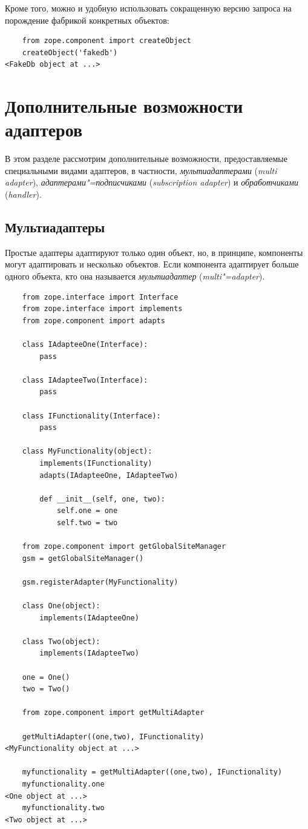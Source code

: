 \documentclass[a4paper,openany,twoside,draft]{book}
\providecommand*{\DUroletitlereference}[1]{\textsl{#1}}
\begin{document}
Кроме того, можно и удобную использовать сокращенную версию запроса на порождение фабрикой конкретных объектов:

\begin{verbatim}
    from zope.component import createObject
    createObject('fakedb')
<FakeDb object at ...>
\end{verbatim}


\chapter{Дополнительные возможности адаптеров%
  \label{id44}%
}

В этом разделе рассмотрим дополнительные возможности, предоставляемые специальными видами адаптеров, в частности, \DUroletitlereference{мультиадаптерами} (\DUroletitlereference{multi adapter}), \DUroletitlereference{адаптерами"=подписчиками} (\DUroletitlereference{subscription adapter}) и \DUroletitlereference{обработчиками} (\DUroletitlereference{handler}).


\section{Мультиадаптеры%
  \label{id45}%
}

Простые адаптеры адаптируют только один объект, но, в принципе, компоненты могут адаптировать и несколько объектов.  Если компонента адаптирует больше одного объекта, кто она называется \DUroletitlereference{мультиадаптер} (\DUroletitlereference{multi"=adapter}).

\begin{verbatim}
    from zope.interface import Interface
    from zope.interface import implements
    from zope.component import adapts

    class IAdapteeOne(Interface):
        pass

    class IAdapteeTwo(Interface):
        pass

    class IFunctionality(Interface):
        pass

    class MyFunctionality(object):
        implements(IFunctionality)
        adapts(IAdapteeOne, IAdapteeTwo)

        def __init__(self, one, two):
            self.one = one
            self.two = two

    from zope.component import getGlobalSiteManager
    gsm = getGlobalSiteManager()

    gsm.registerAdapter(MyFunctionality)

    class One(object):
        implements(IAdapteeOne)

    class Two(object):
        implements(IAdapteeTwo)

    one = One()
    two = Two()

    from zope.component import getMultiAdapter

    getMultiAdapter((one,two), IFunctionality)
<MyFunctionality object at ...>

    myfunctionality = getMultiAdapter((one,two), IFunctionality)
    myfunctionality.one
<One object at ...>
    myfunctionality.two
<Two object at ...>
\end{verbatim}
\end{document}

